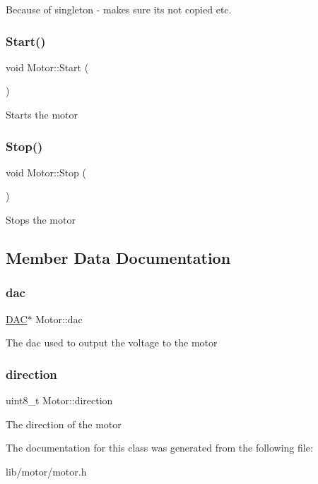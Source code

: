 Because of singleton -\/ makes sure its not copied etc. \hypertarget{class_motor_a4c449b886767bb6f76c3197fd7d072c3}{}\label{class_motor_a4c449b886767bb6f76c3197fd7d072c3} 
\subsubsection{\texorpdfstring{Start()}{Start()}}
{\footnotesize\ttfamily void Motor\+::\+Start (\begin{DoxyParamCaption}{ }\end{DoxyParamCaption})}

Starts the motor \hypertarget{class_motor_a8f0fdb6c977ea11e89281c51534850ca}{}\label{class_motor_a8f0fdb6c977ea11e89281c51534850ca} 
\subsubsection{\texorpdfstring{Stop()}{Stop()}}
{\footnotesize\ttfamily void Motor\+::\+Stop (\begin{DoxyParamCaption}{ }\end{DoxyParamCaption})}

Stops the motor 

\subsection{Member Data Documentation}
\hypertarget{class_motor_ab8662062a02d2177b7694d5ab6ac6851}{}\label{class_motor_ab8662062a02d2177b7694d5ab6ac6851} 
\subsubsection{\texorpdfstring{dac}{dac}}
{\footnotesize\ttfamily \hyperlink{class_d_a_c}{D\+AC}$\ast$ Motor\+::dac\hspace{0.3cm}{\ttfamily [private]}}

The dac used to output the voltage to the motor \hypertarget{class_motor_a717a5684a774d01f46c8ae7145158279}{}\label{class_motor_a717a5684a774d01f46c8ae7145158279} 
\subsubsection{\texorpdfstring{direction}{direction}}
{\footnotesize\ttfamily uint8\+\_\+t Motor\+::direction\hspace{0.3cm}{\ttfamily [private]}}

The direction of the motor 

The documentation for this class was generated from the following file\+:\begin{DoxyCompactItemize}
\item 
lib/motor/motor.\+h\end{DoxyCompactItemize}
